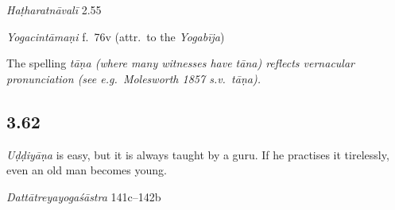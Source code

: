 \begin{ekdosis}
\begin{testimonia}[hp03_061]
\emph{Haṭharatnāvalī} 2.55
\begin{versinnote}
\end{versinnote}

\emph{Yogacintāmaṇi} f.~76v (attr.~to the \emph{Yogabīja})
\begin{versinnote}
\end{versinnote}

\end{testimonia}

\begin{philcomm}[hp03_061]
The spelling \sl{tāṇa} (where many witnesses have \emph{tāna}) reflects vernacular pronunciation (see e.g.~Molesworth 1857 s.v.~\emph{tāṇa}). 
\end{philcomm}


\subsection*{3.62}
\begin{translation}[hp03_062]
\emph{Uḍḍiyāṇa} is easy, but it is always taught by a guru. If he practises it tirelessly, even an old man becomes young.%
\end{translation}

\begin{sources}[hp03_062]
\emph{Dattātreyayogaśāstra} 141c–142b
\begin{versinnote}
\tl{\var{141d guruṇā ] guṇaughāt \pi}\\!}
\end{versinnote}
\end{sources}


\end{ekdosis}
